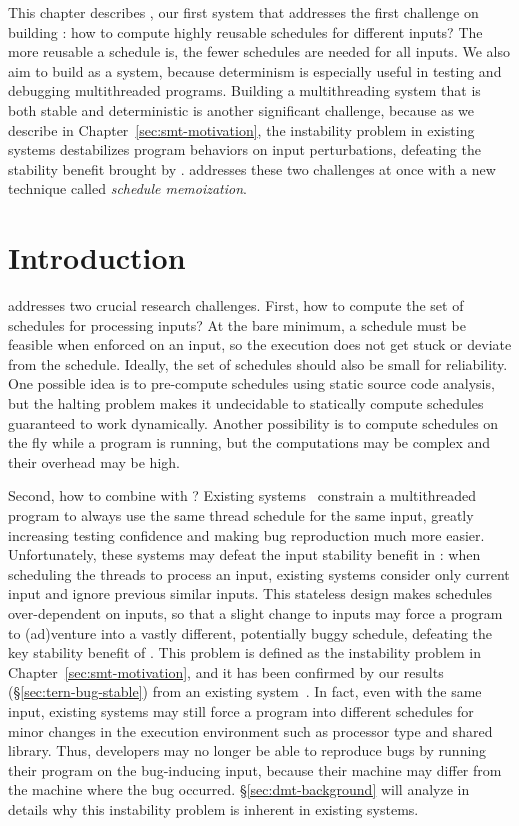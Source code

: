 This chapter describes \tern, our first \smt system that
addresses the first challenge on building \smt: how to compute highly reusable
schedules for different inputs? The more reusable a schedule is, the fewer
schedules are needed for all inputs. We also aim to build \tern as a \dmt 
system, because determinism is especially useful in testing and debugging 
multithreaded programs. Building a multithreading system that is both stable 
and deterministic is another significant challenge, because as we describe in 
Chapter~\ref{sec:smt-motivation}, the instability problem in existing \dmt 
systems destabilizes program behaviors on input perturbations,
defeating the stability benefit brought by \smt. \tern addresses these two 
challenges at once with a new technique called \emph{schedule memoization}.


\section{Introduction} \label{sec:tern-overview}

\tern addresses two crucial research challenges. First, how to compute the set
of schedules for processing inputs?  At the bare minimum, a schedule must be
feasible when enforced on an input, so the execution does not get stuck or
deviate from the schedule.  Ideally, the set of schedules should also be small
for reliability.  One possible idea is to pre-compute schedules using static
source code analysis, but the halting problem makes it undecidable to
statically compute schedules guaranteed to work dynamically.  Another
possibility is to compute schedules on the fly while a program is running,
but the computations may be complex and their overhead may be high.

Second, how to combine \dmt with \smt? Existing \dmt
systems~\cite{dmp:asplos09,coredet:asplos10,kendo:asplos09} constrain a
multithreaded program to always use the same thread schedule for the same input,
greatly increasing testing confidence and making bug reproduction much more
easier. Unfortunately, these \dmt systems may defeat the input stability
benefit in \smt: when scheduling the threads to process an
input, existing \dmt systems consider only current input and ignore previous
similar inputs.  This stateless design makes schedules over-dependent on inputs,
so that a slight change to inputs may force a program to (ad)venture into a
vastly different, potentially buggy schedule, defeating the key stability
benefit of \smt.  This problem is defined as the instability problem in 
Chapter~\ref{sec:smt-motivation}, and it has been
confirmed by our results (\S\ref{sec:tern-bug-stable}) from an existing \dmt
system~\cite{coredet:asplos10}. In fact, even with the same 
input, existing \dmt systems may still force a program into different schedules 
for minor changes in the execution environment such as processor type and 
shared library.  Thus, developers may no longer be able to reproduce bugs by 
running their program on the bug-inducing input, because their machine may 
differ from the machine where the bug occurred. \S\ref{sec:dmt-background} will 
analyze in details why this instability problem is inherent in existing \dmt 
systems.

